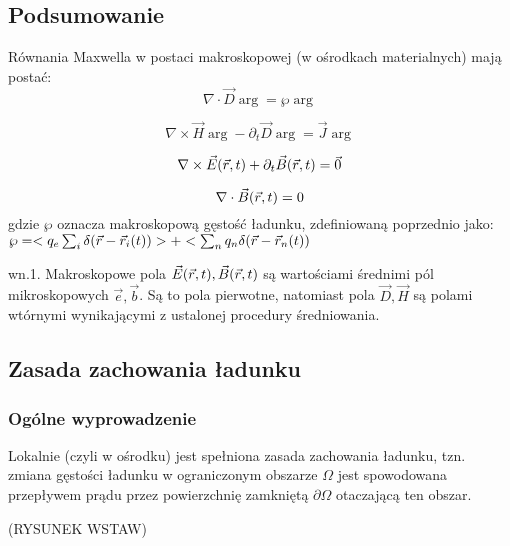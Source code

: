\subsection{Podsumowanie}
Równania Maxwella w postaci makroskopowej (w ośrodkach materialnych) mają postać:
\begin{equation} \nabla \cdot \vec{D}\arg=\wp\arg \label{r1}
 \end{equation}
  
  \begin{equation} \nabla \times \vec{H}\arg-\partial_t\vec{D}\arg=\vec{J}\arg \label{r2}
  \end{equation}

  \begin{equation} \nabla \times \vec{E}(\vec{r},t)+\partial_t \vec{B}(\vec{r},t)=\vec{0} \label{r3}\end{equation} 

  \begin{equation} \nabla \cdot \vec{B}(\vec{r},t)=0 \end{equation}
  gdzie $\wp$ oznacza makroskopową gęstość ładunku, zdefiniowaną poprzednio jako: $\wp=<q_e\sum_i\delta(\vec{r}-\vec{r}_i(t))>+<\sum_nq_n\delta(\vec{r}-\vec{r}_n(t))$

  wn.1. Makroskopowe pola $\vec{E}(\vec{r},t),\vec{B}(\vec{r},t)$ są wartościami średnimi pól mikroskopowych $\vec{e},\vec{b}$. Są to pola pierwotne, natomiast pola $\vec{D},\vec{H}$ są polami wtórnymi wynikającymi z ustalonej procedury średniowania.

  \subsection{Zasada zachowania ładunku}
  \subsubsection{Ogólne wyprowadzenie}
  Lokalnie (czyli w ośrodku) jest spełniona zasada zachowania ładunku, tzn. zmiana gęstości ładunku w ograniczonym obszarze $\Omega$ jest spowodowana przepływem prądu przez powierzchnię zamkniętą $\partial\Omega$ otaczającą ten obszar.

  (RYSUNEK WSTAW)

